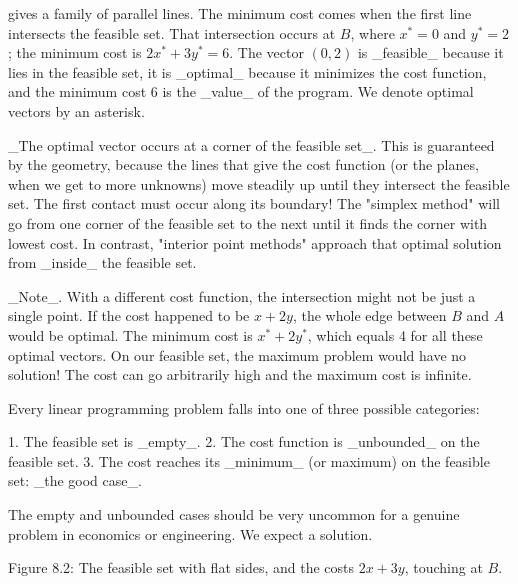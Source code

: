 gives a family of parallel lines. The minimum cost comes when the first line intersects the feasible set. That intersection occurs at \(B\), where \(x^{*}=0\) and \(y^{*}=2\); the minimum cost is \(2x^{*}+3y^{*}=6\). The vector \((0,2)\) is _feasible_ because it lies in the feasible set, it is _optimal_ because it minimizes the cost function, and the minimum cost 6 is the _value_ of the program. We denote optimal vectors by an asterisk.

_The optimal vector occurs at a corner of the feasible set_. This is guaranteed by the geometry, because the lines that give the cost function (or the planes, when we get to more unknowns) move steadily up until they intersect the feasible set. The first contact must occur along its boundary! The "simplex method" will go from one corner of the feasible set to the next until it finds the corner with lowest cost. In contrast, "interior point methods" approach that optimal solution from _inside_ the feasible set.

_Note_. With a different cost function, the intersection might not be just a single point. If the cost happened to be \(x+2y\), the whole edge between \(B\) and \(A\) would be optimal. The minimum cost is \(x^{*}+2y^{*}\), which equals 4 for all these optimal vectors. On our feasible set, the maximum problem would have no solution! The cost can go arbitrarily high and the maximum cost is infinite.

Every linear programming problem falls into one of three possible categories:

1. The feasible set is _empty_.
2. The cost function is _unbounded_ on the feasible set.
3. The cost reaches its _minimum_ (or maximum) on the feasible set: _the good case_.

The empty and unbounded cases should be very uncommon for a genuine problem in economics or engineering. We expect a solution.

Figure 8.2: The feasible set with flat sides, and the costs \(2x+3y\), touching at \(B\).

 